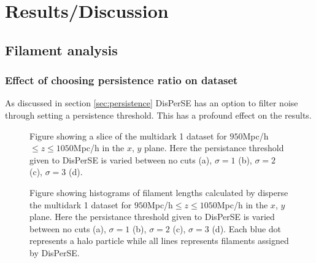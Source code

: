 \chapter{Results/Discussion}

\section{Filament analysis}

\subsection{Effect of choosing persistence ratio on dataset}
As discussed in section \ref{sec:persistence} DisPerSE has an option to filter
noise through setting a persistence threshold. This has a profound effect on the
results.
\begin{figure}[htbp]\label{fig:scatterMD1}
    \hspace{1em}%
    \hspace{1em}%
    \caption{Figure showing a slice of the multidark 1 dataset for $950$Mpc/h$\leq z\leq1050$Mpc/h in the $x$, $y$ plane. Here the persistance threshold given to DisPerSE is varied between no cuts (a), $\sigma=1$ (b), $\sigma=2$ (c), $\sigma=3$ (d).}
\end{figure}
\begin{figure}[htbp]\label{fig:histMD1}
    \hspace{1em}%
    \hspace{1em}%
    \caption{Figure showing histograms of filament lengths calculated by disperse the multidark 1 dataset for $950$Mpc/h$\leq z\leq1050$Mpc/h in the $x$, $y$ plane. Here the persistance threshold given to DisPerSE is varied between no cuts (a), $\sigma=1$ (b), $\sigma=2$ (c), $\sigma=3$ (d). Each blue dot represents a halo particle while all lines represents filaments assigned by DisPerSE.}
\end{figure}
